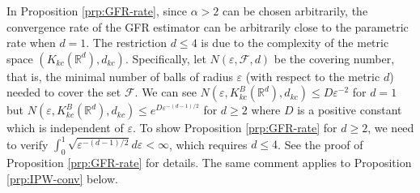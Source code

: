 \documentclass[11pt,reqno]{amsart}
\begin{document}
In Proposition \ref{prp:GFR-rate}, since $\alpha>2$ can be chosen arbitrarily, the convergence rate of the GFR estimator can be arbitrarily close to the parametric rate when $d=1$. The restriction $d\leq 4$ is due to the complexity of the metric space $(K_{kc}(\mathbb{R}^d),d_{kc})$. Specifically, let $N(\varepsilon, \mathcal{F},d)$ be the covering number, that is, the minimal number of balls of radius $\varepsilon$ (with respect to the metric $d$) needed to cover the set $\mathcal{F}$. We can see $N(\varepsilon, K_{kc}^B(\mathbb{R}^d),d_{kc}) \leq D\varepsilon^{-2}$ for $d=1$ but $N(\varepsilon, K_{kc}^B(\mathbb{R}^d),d_{kc}) \leq e^{D\varepsilon^{-(d-1)/2}}$ for $d\geq 2$ where $D$ is a positive constant which is independent of $\varepsilon$. To show Proposition \ref{prp:GFR-rate} for $d\geq 2$, we need to verify $\int_0^1 \sqrt{\varepsilon^{-(d-1)/2}}d\varepsilon<\infty$, which requires $d\leq 4$. See the proof of Proposition \ref{prp:GFR-rate} for details. The same comment applies to Proposition \ref{prp:IPW-conv} below.
\end{document}
